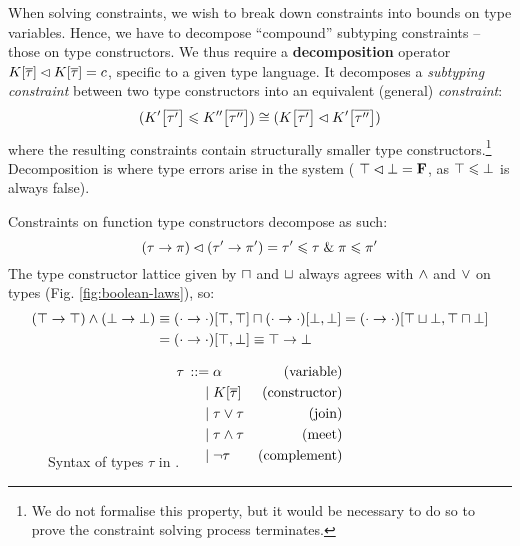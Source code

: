 When solving constraints, we wish to break down constraints into bounds on type variables. Hence, we have to decompose \enquote{compound} subtyping constraints -- those on type constructors. We thus require a \textbf{decomposition} operator $K[\overline \tau] \lhd K[\overline \tau] = c$, specific to a given type language. It decomposes a \emph{subtyping constraint} between two type constructors into an equivalent (general) \emph{constraint}:
$$ (\constr'\left[\overline {\tau'}\right] \sub \constr''\left[\overline {\tau''}\right]) \cstreq (\constr\left[\overline {\tau'}\right] \cdecomp \constr'\left[\overline {\tau''}\right]) $$
where the resulting constraints contain structurally smaller type constructors.\footnote{We do not formalise this property, but it would be necessary to do so to prove the constraint solving process terminates.} Decomposition is where type errors arise in the system (\eg{} $\top \lhd \bot = \mathbf F$, as $\top \leqslant \bot$ is always false). 
\begin{example}
    Constraints on function type constructors decompose as such:
    $$ (\tau \to \pi) \lhd (\tau' \to \pi') = \tau' \leqslant \tau \;\&\; \pi \leqslant \pi' $$
    The type constructor lattice given by $\sqcap$ and $\sqcup$ always agrees with $\land$ and $\lor$ on types (Fig. \ref{fig:boolean-laws}), so:
    \begin{align*}
       (\top \to \top) \land (\bot \to \bot) 
       &\equiv (\cdot \to \cdot)[\top, \top] \sqcap (\cdot \to \cdot)[\bot, \bot] = (\cdot \to \cdot)[\top \sqcup \bot, \top \sqcap \bot] \\
       &= (\cdot \to \cdot)[\top, \bot] \equiv \top \to \bot 
    \end{align*}
\end{example}

\begin{figure}
    \centering
    \begin{align*}
    {\tau} \,::=&\; 
             \alpha & \text{(variable)}
    \\ \mid&\; K[\overline \tau] & \text{(constructor)}
    \\ \mid&\; \tau \lor \tau & \text{(join)}
    \\ \mid&\; \tau \land \tau & \text{(meet)}
    \\ \mid&\; \lnot \tau & \text{(complement)} \\[-2em]
    \end{align*}
    \caption{Syntax of types $\tau$ in \inference{}.}
    \label{fig:signature-types}
\end{figure}

